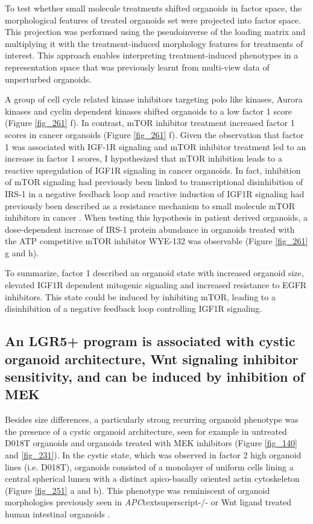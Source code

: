 \begin{flushleft}
To test whether small molecule treatments shifted organoids in factor space, the morphological features of treated organoids set were projected into factor space. This projection was performed using the pseudoinverse of the loading matrix and multiplying it with the treatment-induced morphology features for treatments of interest. This approach enables interpreting treatment-induced phenotypes in a representation space that was previously learnt from multi-view data of unperturbed organoids. 

\bigbreak
A group of cell cycle related kinase inhibitors targeting polo like kinases, Aurora kinases and cyclin dependent kinases shifted organoids to a low factor 1 score (Figure \ref{fig_261} f). In contrast, mTOR inhibitor treatment increased factor 1 scores in cancer organoids (Figure \ref{fig_261} f). Given the observation that factor 1 was associated with IGF-1R signaling and mTOR inhibitor treatment led to an increase in factor 1 scores, I hypothesized that mTOR inhibition leads to a reactive upregulation of IGF1R signaling in cancer organoids. In fact, inhibition of mTOR signaling had previously been linked to transcriptional disinhibition of IRS-1 in a negative feedback loop \parencite{oreillyMTORInhibitionInduces2006} and  reactive induction of IGF1R signaling had previously been described as a resistance mechanism to small molecule mTOR inhibitors in cancer \parencite{sharmaChromatinmediatedReversibleDrugtolerant2010}. When testing this hypothesis in patient derived organoids, a dose-dependent increase of IRS-1 protein abundance in organoids treated with the ATP competitive mTOR inhibitor WYE-132 was observable (Figure \ref{fig_261} g and h). 

\bigbreak
To summarize, factor 1 described an organoid state with increased organoid size, elevated IGF1R dependent mitogenic signaling and increased resistance to EGFR inhibitors. This state could be induced by inhibiting mTOR, leading to a disinhibition of a negative feedback loop controlling IGF1R signaling.

\newpage
\subsection{An LGR5+ program is associated with cystic organoid architecture, Wnt signaling inhibitor sensitivity, and can be induced by inhibition of MEK}

Besides size differences, a particularly strong recurring organoid phenotype was the presence of a cystic organoid architecture, seen for example in untreated D018T organoids and organoids treated with MEK inhibitors (Figure \ref{fig_140} and \ref{fig_231}). In the cystic state, which was observed in factor 2 high organoid lines (i.e. D018T), organoids consisted of a monolayer of uniform cells lining a central spherical lumen with a distinct apico-basally oriented actin cytoskeleton (Figure \ref{fig_251} a and b). This phenotype was reminiscent of organoid morphologies previously seen in \textit{APC}textsuperscript{-/-} or Wnt ligand treated human intestinal organoids \parencite{matanoModelingColorectalCancer2015a}. 


\end{flushleft}
